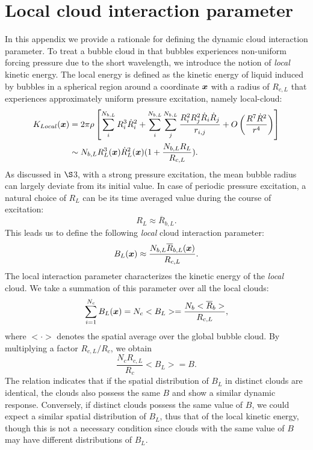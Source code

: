 \documentclass{jfm}
\def\vector#1{\mbox{\boldmath $#1$}}
\begin{document}
\section{Local cloud interaction parameter}
In this appendix we provide a rationale for defining the dynamic cloud interaction parameter.
To treat a bubble cloud in that bubbles experiences non-uniform forcing pressure due to the short wavelength, we introduce the notion of {\it{local}} kinetic energy.
The local energy is defined as the kinetic energy of liquid induced by bubbles in a spherical region around a coordinate $\vector{x}$ with a radius of $R_{c,L}$ that experiences approximately uniform pressure excitation, namely local-cloud:
\begin{align}
K_{Local}(\vector{x})
&= 2\pi\rho\left[\sum^{N_{b,L}}_iR_i^3\dot{R}_i^2+\sum^{N_{b,L}}_i\sum^{N_{b,L}}_j\frac{R_i^2R_j^2\dot{R}_i\dot{R}_j}{r_{i,j}}+O\left(\frac{R^7\dot{R}^2}{r^4}\right)\right]\\
&\sim
N_{b,L}R_L^3(\vector{x})\dot{R}_L^2(\vector{x})(1+\frac{N_{b,L}R_L}{R_{c,L}}).\label{eqn:Ksub}
\end{align}
As discussed in $\S$3, with a strong pressure excitation, the mean bubble radius can largely deviate from its initial value.
In case of periodic pressure excitation, a natural choice of $R_{L}$ can be its time averaged value during the course of excitation:
\begin{equation}
R_{L}\approx\overline{R}_{b,L}.
\end{equation}
This leads us to define the following {\it{local}} cloud interaction parameter:
\begin{equation}
B_{L}(\vector{x})\approx\frac{N_{b,L}\overline{R}_{b,L}(\vector{x})}{R_{c,L}}.
\end{equation}
The local interaction parameter characterizes the kinetic energy of the {\it{local}} cloud.
We take a summation of this parameter over all the local clouds:
\begin{equation}
\sum^{N_c}_{i=1}B_L(\vector{x})
=
N_c<B_L>
=
\frac{N_{b}<\overline{R}_{b}>}{R_{c,L}},
\end{equation}
where $<\cdot>$ denotes the spatial average over the global bubble cloud.
By multiplying a factor $R_{c,L}/R_c$, we obtain
\begin{equation}
\frac{N_cR_{c,L}}{R_c}<B_L>
=
B.
\end{equation}
The relation indicates that if the spatial distribution of $B_L$ in distinct clouds are identical, the clouds also possess the same $B$ and show a similar dynamic response.
Conversely, if distinct clouds possess the same value of $B$, we could expect a similar spatial distribution of $B_L$, thus that of the local kinetic energy, though this is not a necessary condition since clouds with the same value of $B$ may have different distributions of $B_L$.
\end{document}
